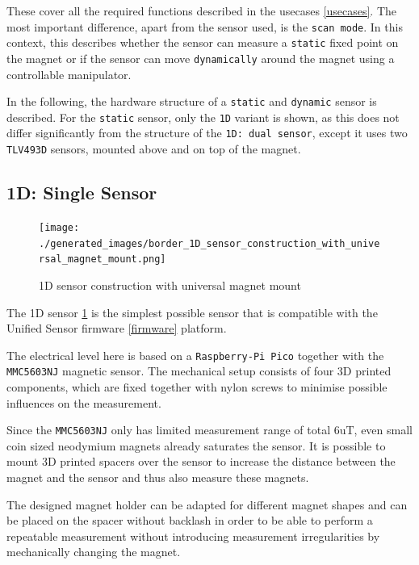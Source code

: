 These cover all the required functions described in the usecases
\ref{usecases}. The most important difference, apart from the sensor
used, is the \passthrough{\lstinline!scan mode!}. In this context, this
describes whether the sensor can measure a
\passthrough{\lstinline!static!} fixed point on the magnet or if the
sensor can move \passthrough{\lstinline!dynamically!} around the magnet
using a controllable manipulator.

In the following, the hardware structure of a
\passthrough{\lstinline!static!} and \passthrough{\lstinline!dynamic!}
sensor is described. For the \passthrough{\lstinline!static!} sensor,
only the \passthrough{\lstinline!1D!} variant is shown, as this does not
differ significantly from the structure of the
\passthrough{\lstinline!1D: dual sensor!}, except it uses two
\passthrough{\lstinline!TLV493D!} sensors, mounted above and on top of
the magnet.

\hypertarget{d-single-sensor}{%
\subsection{1D: Single Sensor}\label{d-single-sensor}}

\begin{figure}
\centering
\texttt{[image: ./generated\_images/border\_1D\_sensor\_construction\_with\_universal\_magnet\_mount.png]}
\caption{1D sensor construction with universal magnet mount
\label{1D_sensor_construction_with_universal_magnet_mount.png}}
\end{figure}

The 1D sensor
\ref{1D_sensor_construction_with_universal_magnet_mount.png} is the
simplest possible sensor that is compatible with the Unified Sensor
firmware \ref{firmware} platform.

The electrical level here is based on a
\passthrough{\lstinline!Raspberry-Pi Pico!} together with the
\passthrough{\lstinline!MMC5603NJ!} magnetic sensor. The mechanical
setup consists of four 3D printed components, which are fixed together
with nylon screws to minimise possible influences on the measurement.

Since the \passthrough{\lstinline!MMC5603NJ!} only has limited
measurement range of total 6uT, even small coin sized neodymium magnets
already saturates the sensor. It is possible to mount 3D printed spacers
over the sensor to increase the distance between the magnet and the
sensor and thus also measure these magnets.

The designed magnet holder can be adapted for different magnet shapes
and can be placed on the spacer without backlash in order to be able to
perform a repeatable measurement without introducing measurement
irregularities by mechanically changing the magnet.

